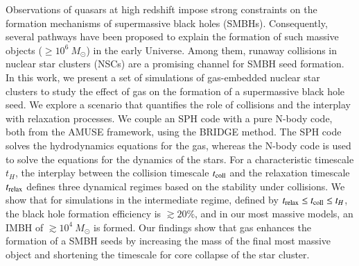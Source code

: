 \documentclass[
	english, %
	letterpaper, oneside
]{book}
\begin{document}
\templatePortrait

\templatePagecfg

\begin{abstractd}
	Observations of quasars at high redshift impose strong constraints on the formation mechanisms of supermassive black holes (SMBHs). Consequently, several pathways have been proposed to explain the formation of such massive objects ($\geq 10^6~M_{\odot}$) in the early Universe. Among them, runaway collisions in nuclear star clusters (NSCs) are a promising channel for SMBH seed formation. In this work, we present a set of simulations of gas-embedded nuclear star clusters to study the effect of gas on the formation of a supermassive black hole seed. We explore a scenario that quantifies the role of collisions and the interplay with relaxation processes. We couple an SPH code with a pure N-body code, both from the AMUSE framework, using the BRIDGE method. The SPH code solves the hydrodynamics equations for the gas, whereas the N-body code is used to solve the equations for the dynamics
	of the stars. For a characteristic timescale $t_{H}$, the interplay between the collision timescale $t_{\rm coll}$ and the relaxation timescale $t_{\rm relax}$ defines three dynamical regimes based on the stability under collisions. We show that for simulations in the intermediate regime, defined by $t_{\rm relax} \leq t_{\rm coll} \leq t_{H}$, the black hole formation efficiency is $\gtrsim 20\%$, and in our most massive models, an IMBH of $\gtrsim 10^4~M_{\odot}$ is formed. Our findings show that gas enhances the formation of a SMBH seeds by increasing the mass of the final most massive object and shortening the timescale for core collapse of the star cluster.
\end{abstractd}
\end{document}
